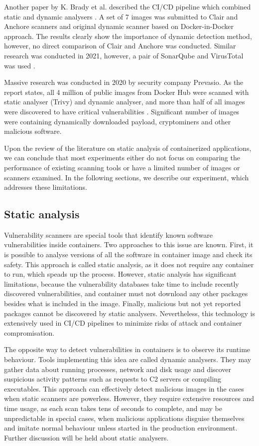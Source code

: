 Another paper by K. Brady et al. described the CI/CD pipeline which combined static and dynamic analysers \cite{c:2}. A set of 7 images was submitted to Clair and Anchore scanners and original dynamic scanner based on Docker-in-Docker approach. The results clearly show the importance of dynamic detection method, however, no direct comparison of Clair and Anchore was conducted. Similar research was conducted in 2021, however, a pair of SonarQube and VirusTotal was used \cite{c:3}.

Massive research was conducted in 2020 by security company Prevasio. As the report states, all 4 million of public images from Docker Hub were scanned with static analyser (Trivy) and dynamic analyser, and more than half of all images were discovered to have critical vulnerabilities \cite{report:dynamic}. Significant number of images were containing dynamically downloaded payload, cryptominers and other malicious software.

Upon the review of the literature on static analysis of containerized applications, we can conclude that most experiments either do not focus on comparing the performance of existing scanning tools or have a limited number of images or scanners examined. In the following sections, we describe our experiment, which addresses these limitations.

\clearpage
\subsection{Static analysis}

Vulnerability scanners are special tools that identify known software vulnerabilities inside containers. Two approaches to this issue are known. First, it is possible to analyse versions of all the software in container image and check its safety. This approach is called static analysis, as it does not require any container to run, which speads up the process. However, static analysis has significant limitations, because the vulnerability databases take time to include recently discovered vulnerabilities, and container must not download any other packages besides what is included in the image. Finally, malicious but not yet reported packages cannot be discovered by static analysers. Nevertheless, this technology is extensively used in CI/CD pipelines to minimize risks of attack and container compromisation.

The opposite way to detect vulnerabilities in containers is to observe its runtime behaviour. Tools implementing this idea are called dynamic analysers. They may gather data about running processes, network and disk usage and discover suspicious activity patterns such as requests to C2 servers or compiling executables. This approach can effectively detect malicious images in the cases when static scanners are powerless. However, they require extensive resources and time usage, as each scan takes tens of seconds to complete, and may be unpredictable in special cases, when malicious applications disguise themselves and imitate normal behaviour unless started in the production environment. Further discussion will be held about static analysers.

